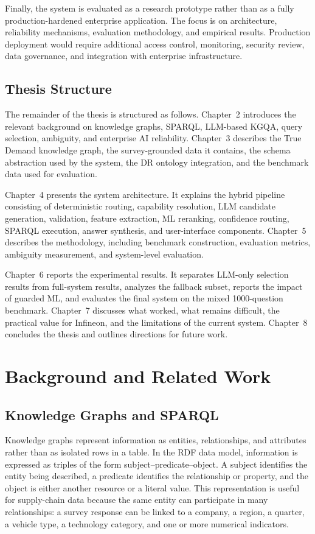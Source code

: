 \documentclass[
  12pt,
  english,
  oneside]{report}
\begin{document}
Finally, the system is evaluated as a research prototype rather than as a fully production-hardened enterprise application. The focus is on architecture, reliability mechanisms, evaluation methodology, and empirical results. Production deployment would require additional access control, monitoring, security review, data governance, and integration with enterprise infrastructure.

\section{Thesis Structure}

The remainder of the thesis is structured as follows. Chapter~2 introduces the relevant background on knowledge graphs, SPARQL, LLM-based KGQA, query selection, ambiguity, and enterprise AI reliability. Chapter~3 describes the True Demand knowledge graph, the survey-grounded data it contains, the schema abstraction used by the system, the DR ontology integration, and the benchmark data used for evaluation.

Chapter~4 presents the system architecture. It explains the hybrid pipeline consisting of deterministic routing, capability resolution, LLM candidate generation, validation, feature extraction, ML reranking, confidence routing, SPARQL execution, answer synthesis, and user-interface components. Chapter~5 describes the methodology, including benchmark construction, evaluation metrics, ambiguity measurement, and system-level evaluation.

Chapter~6 reports the experimental results. It separates LLM-only selection results from full-system results, analyzes the fallback subset, reports the impact of guarded ML, and evaluates the final system on the mixed 1000-question benchmark. Chapter~7 discusses what worked, what remains difficult, the practical value for Infineon, and the limitations of the current system. Chapter~8 concludes the thesis and outlines directions for future work.


\chapter{Background and Related Work}

\section{Knowledge Graphs and SPARQL}

Knowledge graphs represent information as entities, relationships, and attributes rather than as isolated rows in a table. In the RDF data model, information is expressed as triples of the form subject--predicate--object. A subject identifies the entity being described, a predicate identifies the relationship or property, and the object is either another resource or a literal value. This representation is useful for supply-chain data because the same entity can participate in many relationships: a survey response can be linked to a company, a region, a quarter, a vehicle type, a technology category, and one or more numerical indicators.
\end{document}
